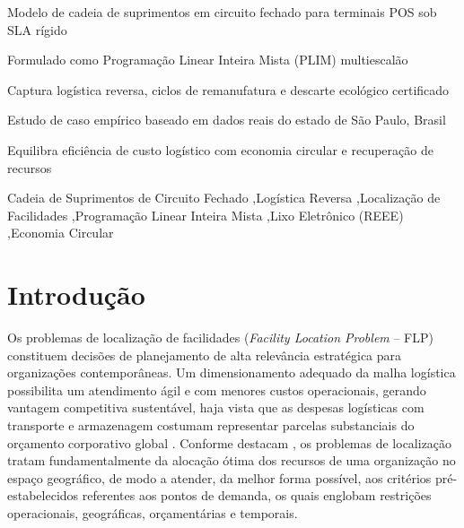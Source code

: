 \documentclass[preprint,12pt,authoryear]{elsarticle}
\begin{document}
\begin{frontmatter}
\begin{highlights}
\item Modelo de cadeia de suprimentos em circuito fechado para terminais POS sob SLA rígido
\item Formulado como Programação Linear Inteira Mista (PLIM) multiescalão
\item Captura logística reversa, ciclos de remanufatura e descarte ecológico certificado
\item Estudo de caso empírico baseado em dados reais do estado de São Paulo, Brasil
\item Equilibra eficiência de custo logístico com economia circular e recuperação de recursos
\end{highlights}

\begin{keyword}
Cadeia de Suprimentos de Circuito Fechado \sep Logística Reversa \sep Localização de Facilidades \sep Programação Linear Inteira Mista \sep Lixo Eletrônico (REEE) \sep Economia Circular
\end{keyword}

\end{frontmatter}

\section{Introdução}
\label{sec:intro}

Os problemas de localização de facilidades (\emph{Facility Location Problem} -- FLP) constituem decisões de planejamento de alta relevância estratégica para organizações contemporâneas. Um dimensionamento adequado da malha logística possibilita um atendimento ágil e com menores custos operacionais, gerando vantagem competitiva sustentável, haja vista que as despesas logísticas com transporte e armazenagem costumam representar parcelas substanciais do orçamento corporativo global \citep{Owen1998Strategic}. Conforme destacam \citet{oliveira2012sistema}, os problemas de localização tratam fundamentalmente da alocação ótima dos recursos de uma organização no espaço geográfico, de modo a atender, da melhor forma possível, aos critérios pré-estabelecidos referentes aos pontos de demanda, os quais englobam restrições operacionais, geográficas, orçamentárias e temporais.
\end{document}
